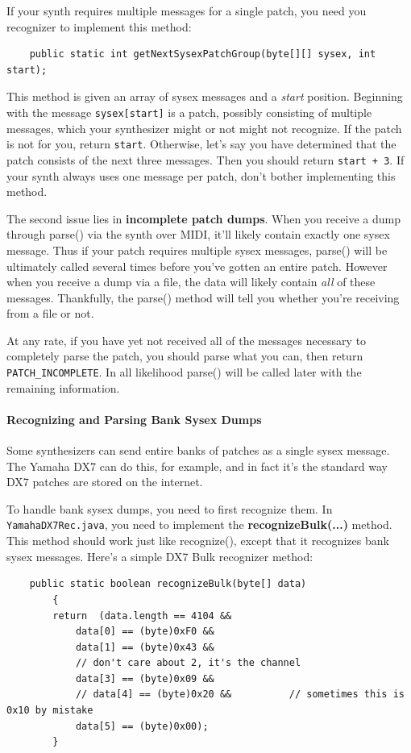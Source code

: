 \documentclass{article}
\begin{document}
If your synth requires multiple messages for a single patch, you need you recognizer to implement this method:

\begin{verbatim}
    public static int getNextSysexPatchGroup(byte[][] sysex, int start);
\end{verbatim}

This method is given an array of sysex messages and a {\it start} position.  Beginning with the message {\tt sysex[start]} is a patch, possibly consisting of multiple messages, which your synthesizer might or not might not recognize.  If the patch is not for you, return {\tt start}.  Otherwise, let's say you have determined that the patch consists of the next three messages.  Then you should return {\tt start + 3}.  If your synth always uses one message per patch, don't bother implementing this method.

The second issue lies in {\bf incomplete patch dumps}.  When you receive a dump through parse() via the synth over MIDI, it'll likely contain exactly one sysex message.  Thus if your patch requires multiple sysex messages, parse() will be ultimately called several times before you've gotten an entire patch.  However when you receive a dump via a file, the data will likely contain {\it all} of these messages.  Thankfully, the parse() method will tell you whether you're receiving from a file or not.  

At any rate, if you have yet not received all of the messages necessary to completely parse the patch, you should parse what you can, then return {\tt PATCH\_INCOMPLETE}.  In all likelihood parse() will be called later with the remaining information.

\paragraph{Recognizing and Parsing Bank Sysex Dumps}

Some synthesizers can send entire banks of patches as a single sysex message.  The Yamaha DX7 can do this, for example, and in fact it's the standard way DX7 patches are stored on the internet.

To handle bank sysex dumps, you need to first recognize them.  In {\tt YamahaDX7Rec.java}, you need to implement the {\bf recognizeBulk(...)} method.  This method should work just like recognize(), except that it recognizes bank sysex messages.  Here's a simple DX7 Bulk recognizer method:

\begin{verbatim}
    public static boolean recognizeBulk(byte[] data)
        {
        return  (data.length == 4104 &&
            data[0] == (byte)0xF0 &&
            data[1] == (byte)0x43 &&
            // don't care about 2, it's the channel
            data[3] == (byte)0x09 &&
            // data[4] == (byte)0x20 &&          // sometimes this is 0x10 by mistake
            data[5] == (byte)0x00);
        } 
\end{verbatim}
\end{document}
